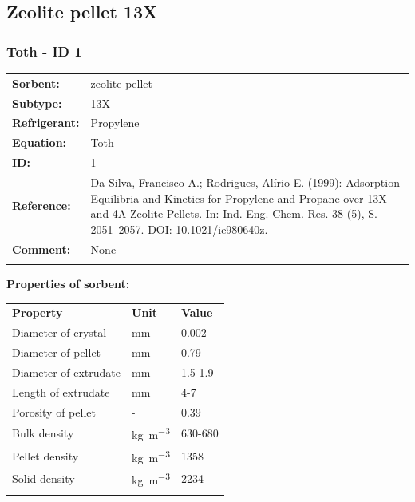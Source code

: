 \subsection{Zeolite pellet 13X}
%
\subsubsection{Toth - ID 1}
%
\begin{tabular}[l]{|lp{11.5cm}|}
\hline
\addlinespace

\textbf{Sorbent:} & zeolite pellet \\
\textbf{Subtype:} & 13X \\
\textbf{Refrigerant:} & Propylene \\
\textbf{Equation:} & Toth \\
\textbf{ID:} & 1 \\
\textbf{Reference:} & Da Silva, Francisco A.; Rodrigues, Alírio E. (1999): Adsorption Equilibria and Kinetics for Propylene and Propane over 13X and 4A Zeolite Pellets. In: Ind. Eng. Chem. Res. 38 (5), S. 2051–2057. DOI: 10.1021/ie980640z. \\
\textbf{Comment:} & None \\

\addlinespace
\hline
\end{tabular}
\newline

\textbf{Properties of sorbent:}
\newline
%
\begin{longtable}[l]{lll}
\toprule
\addlinespace
\textbf{Property} & \textbf{Unit} & \textbf{Value} \\
\addlinespace
\midrule
\endhead
\bottomrule
\endfoot
\bottomrule
\endlastfoot
\addlinespace

Diameter of crystal & \si{\milli\meter} & 0.002\\
Diameter of pellet & \si{\milli\meter} & 0.79\\
Diameter of extrudate & \si{\milli\meter} & 1.5-1.9\\
Length of extrudate & \si{\milli\meter} & 4-7\\
Porosity of pellet & - & 0.39\\
Bulk density & \si{\kilogram\per\cubic\meter} & 630-680\\
Pellet density & \si{\kilogram\per\cubic\meter} & 1358\\
Solid density & \si{\kilogram\per\cubic\meter} & 2234\\

\addlinespace\end{longtable}

